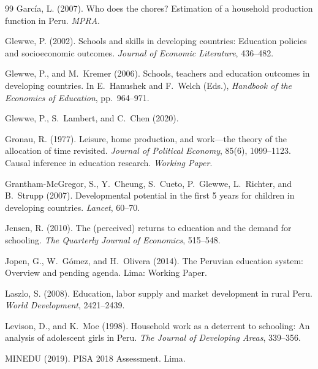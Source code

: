 \documentclass[12pt]{article}
\begin{document}
\begin{thebibliography}{99}
Garc\'{i}a, L. (2007).
\newblock Who does the chores? Estimation of a household production function
  in Peru.
\newblock \textit{MPRA}.

Glewwe, P. (2002).
\newblock Schools and skills in developing countries: Education policies and
  socioeconomic outcomes.
\newblock \textit{Journal of Economic Literature}, 436--482.

Glewwe, P., and M.~Kremer (2006).
\newblock Schools, teachers and education outcomes in developing countries.
\newblock In E.~Hanushek and F.~Welch (Eds.), \textit{Handbook of the
  Economics of Education}, pp.~964--971.

Glewwe, P., S.~Lambert, and C.~Chen (2020).

Gronau, R. (1977).
\newblock Leisure, home production, and work---the theory of the allocation of
  time revisited.
\newblock \textit{Journal of Political Economy}, 85(6), 1099--1123.
\newblock Causal inference in education research.
\newblock \textit{Working Paper}.

Grantham-McGregor, S., Y.~Cheung, S.~Cueto, P.~Glewwe, L.~Richter, and
  B.~Strupp (2007).
\newblock Developmental potential in the first 5 years for children in
  developing countries.
\newblock \textit{Lancet}, 60--70.

Jensen, R. (2010).
\newblock The (perceived) returns to education and the demand for schooling.
\newblock \textit{The Quarterly Journal of Economics}, 515--548.

Jopen, G., W.~G\'{o}mez, and H.~Olivera (2014).
\newblock The Peruvian education system: Overview and pending agenda.
\newblock Lima: Working Paper.

Laszlo, S. (2008).
\newblock Education, labor supply and market development in rural Peru.
\newblock \textit{World Development}, 2421--2439.

Levison, D., and K.~Moe (1998).
\newblock Household work as a deterrent to schooling: An analysis of adolescent
  girls in Peru.
\newblock \textit{The Journal of Developing Areas}, 339--356.

MINEDU (2019).
\newblock PISA 2018 Assessment.
\newblock Lima.


\end{thebibliography}
\end{document}
